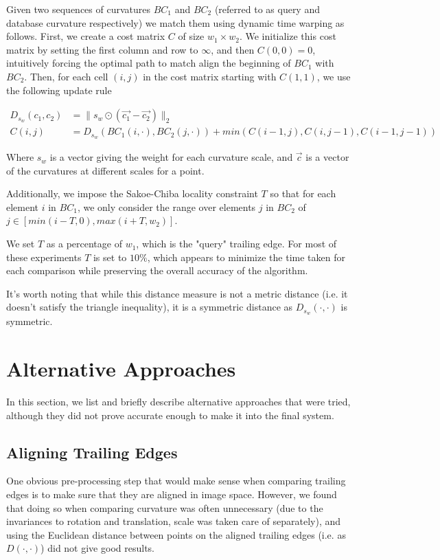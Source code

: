 Given two sequences of curvatures $BC_1$ and $BC_2$ (referred to as query and database curvature respectively) we match them using dynamic time warping as follows.
First, we create a cost matrix $C$ of size $w_1 \times w_2$. 
We initialize this cost matrix by setting the first column and row to $\infty$, and then $C(0,0) = 0$, intuitively forcing the optimal path to match align the beginning of $BC_1$ with $BC_2$.
Then, for each cell $(i,j)$ in the cost matrix starting with $C(1,1)$, we use the following update rule

\begin{align}
D_{s_w}(c_1, c_2) &= \lVert s_w \odot (\vec{c_1} - \vec{c_2}) \rVert_2\\
C(i,j) &= D_{s_w}(BC_1(i,\cdot),BC_2(j,\cdot)) + min(C(i-1,j), C(i,j-1), C(i-1, j-1))
\end{align}

Where $s_w$ is a vector giving the weight for each curvature scale, and $\vec{c}$ is a vector of the curvatures at different scales for a point.

Additionally, we impose the Sakoe-Chiba \cite{sakoe1978dynamic} locality constraint $T$ so that for each element $i$ in $BC_1$, we only consider the range over elements $j$ in $BC_2$ of $j \in [min(i - T, 0), max(i + T, w_2)]$.

We set $T$ as a percentage of $w_1$, which is the "query" trailing edge.
For most of these experiments $T$ is set to $10\%$, which appears to minimize the time taken for each comparison while preserving the overall accuracy of the algorithm.

It's worth noting that while this distance measure is not a metric distance (i.e. it doesn't satisfy the triangle inequality), it is a symmetric distance as $D_{s_w}(\cdot,\cdot)$ is symmetric\cite{muller2007information}.

\section{Alternative Approaches}

In this section, we list and briefly describe alternative approaches that were tried, although they did not prove accurate enough to make it into the final system.

\subsection{Aligning Trailing Edges}

One obvious pre-processing step that would make sense when comparing trailing edges is to make sure that they are aligned in image space.
However, we found that doing so when comparing curvature was often unnecessary (due to the invariances to rotation and translation, scale was taken care of separately), and using the Euclidean distance between points on the aligned trailing edges (i.e. as $D(\cdot,\cdot)$) did not give good results.

